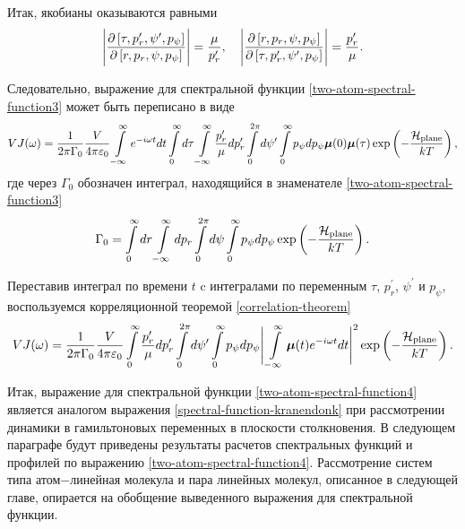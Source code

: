 Итак, якобианы оказываются равными
\begin{gather}
    \Bigg\vert \frac{\partial \left[ \tau, p_r^\prime, \psi^\prime, p_\psi \right]}{\partial \left[ r, p_r, \psi, p_\psi \right]} \Bigg\vert = \frac{\mu}{p_r^\prime}, \quad \Bigg\vert \frac{\partial \left[ r, p_r, \psi, p_\psi \right]}{\partial \left[ \tau, p_r^\prime, \psi^\prime, p_\psi \right]} \Bigg\vert = \frac{p_r^\prime}{\mu}.
\end{gather}

Следовательно, выражение для спектральной функции \eqref{two-atom-spectral-function3} может быть переписано в виде
\begin{gather}
    VJ(\omega) = \frac{1}{2 \pi \Gamma_0} \frac{V}{4 \pi \varepsilon_0} \int\limits_{-\infty}^\infty e^{-i \omega t} dt \int\limits_0^\infty d\tau \int\limits_{-\infty}^\infty \frac{p_r^\prime}{\mu} dp_r^\prime \int\limits_0^{2\pi} d\psi^\prime \int\limits_0^\infty p_\psi dp_\psi \boldsymbol{\mu}(0) \boldsymbol{\mu}(\tau) \exp \left( -\frac{\mathcal{H}_\text{plane}}{kT} \right),
\end{gather}
%
где через $\Gamma_0$ обозначен интеграл, находящийся в знаменателе \eqref{two-atom-spectral-function3}
\begin{gather}
    \Gamma_0 = \int\limits_0^\infty dr \int\limits_{-\infty}^\infty dp_r \int\limits_0^{2\pi} d\psi \int\limits_0^\infty p_\psi dp_\psi \exp \left( -\frac{\mathcal{H}_\text{plane}}{kT} \right).
\end{gather}

Переставив интеграл по времени $t$ c интегралами по переменным $\tau$, $p_r^\prime$, $\psi^\prime$ и $p_\psi$, воспользуемся корреляционной теоремой \eqref{correlation-theorem}
\begin{gather}
    VJ(\omega) = \frac{1}{2 \pi \Gamma_0} \frac{V}{4 \pi \varepsilon_0} \int\limits_0^\infty \frac{p_r^\prime}{\mu} dp_r^\prime \int\limits_0^{2\pi} d\psi^\prime \int\limits_0^\infty p_\psi dp_\psi \Bigg\vert \int\limits_{-\infty}^\infty \boldsymbol{\mu}(t) e^{-i \omega t} dt \Bigg\vert^2 \exp \left( -\frac{\mathcal{H}_\text{plane}}{k T} \right). \label{two-atom-spectral-function4}
\end{gather}

Итак, выражение для спектральной функции \eqref{two-atom-spectral-function4} является аналогом выражения \eqref{spectral-function-kranendonk} при рассмотрении динамики в гамильтоновых переменных в плоскости столкновения. В следующем параграфе будут приведены результаты расчетов спектральных функций и профилей по выражению \eqref{two-atom-spectral-function4}. Рассмотрение систем типа атом$-$линейная молекула и пара линейных молекул, описанное в следующей главе, опирается на обобщение выведенного выражения для спектральной функции. 

